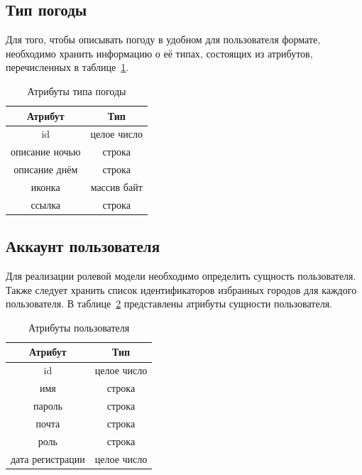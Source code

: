 \subsection*{Тип погоды}
Для того, чтобы описывать погоду в удобном для пользователя формате, необходимо хранить информацию о её типах, состоящих из атрибутов, перечисленных в таблице~\ref{table:type_attr}.

\begin{table}[H]
    \centering
    \begin{tabular}{ |c|c| }
        \hline
            \textbf{Атрибут} & \textbf{Тип} \\
        \hline
            id & целое число \\
        \hline
            описание ночью & строка \\
        \hline
            описание днём & строка \\
        \hline
            иконка & массив байт \\
        \hline
            ссылка & строка \\
        \hline
            
    \end{tabular}
    \caption{\centering Атрибуты типа погоды}
    \label{table:type_attr}
\end{table}

\subsection*{Аккаунт пользователя}
Для реализации ролевой модели необходимо определить сущность пользователя.
Также следует хранить список идентификаторов избранных городов для каждого пользователя.
В таблице~\ref{table:user_attr} представлены атрибуты сущности пользователя.

\begin{table}[H]
    \centering
    \begin{tabular}{ |c|c| }
        \hline
            \textbf{Атрибут} & \textbf{Тип} \\
        \hline
            id & целое число \\
        \hline
            имя & строка \\
        \hline
            пароль & строка \\
        \hline
            почта & строка \\
        \hline
            роль & строка \\
        \hline
            дата регистрации & целое число \\
        \hline
            
    \end{tabular}
    \caption{\centering Атрибуты пользователя}
    \label{table:user_attr}
\end{table}

